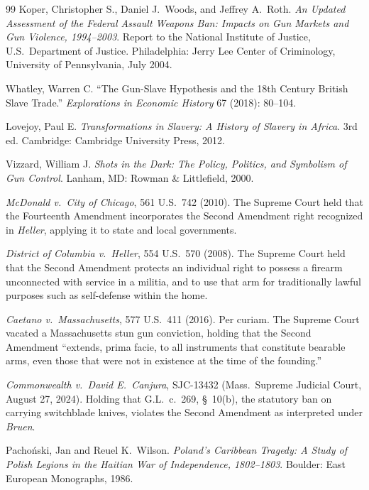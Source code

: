 \documentclass[12pt,openany]{book}
\begin{document}
\begin{thebibliography}{99}
Koper, Christopher S., Daniel J.~Woods, and Jeffrey A.~Roth. \textit{An Updated Assessment of the Federal Assault Weapons Ban: Impacts on Gun Markets and Gun Violence, 1994--2003}. Report to the National Institute of Justice, U.S.~Department of Justice. Philadelphia: Jerry Lee Center of Criminology, University of Pennsylvania, July 2004.

Whatley, Warren C. ``The Gun-Slave Hypothesis and the 18th Century British Slave Trade.'' \textit{Explorations in Economic History} 67 (2018): 80--104.

Lovejoy, Paul E. \textit{Transformations in Slavery: A History of Slavery in Africa}. 3rd ed. Cambridge: Cambridge University Press, 2012.

Vizzard, William J. \textit{Shots in the Dark: The Policy, Politics, and Symbolism of Gun Control}. Lanham, MD: Rowman \& Littlefield, 2000.

\textit{McDonald v.\ City of Chicago}, 561 U.S.~742 (2010). The Supreme Court held that the Fourteenth Amendment incorporates the Second Amendment right recognized in \textit{Heller}, applying it to state and local governments.

\textit{District of Columbia v.\ Heller}, 554 U.S.~570 (2008). The Supreme Court held that the Second Amendment protects an individual right to possess a firearm unconnected with service in a militia, and to use that arm for traditionally lawful purposes such as self-defense within the home.

\textit{Caetano v.\ Massachusetts}, 577 U.S.~411 (2016). Per curiam. The Supreme Court vacated a Massachusetts stun gun conviction, holding that the Second Amendment ``extends, prima facie, to all instruments that constitute bearable arms, even those that were not in existence at the time of the founding.''

\textit{Commonwealth v.\ David E.\ Canjura}, SJC-13432 (Mass.\ Supreme Judicial Court, August 27, 2024). Holding that G.L.\ c.~269, \S~10(b), the statutory ban on carrying switchblade knives, violates the Second Amendment as interpreted under \textit{Bruen}.

Pacho\'{n}ski, Jan and Reuel K.~Wilson. \textit{Poland's Caribbean Tragedy: A Study of Polish Legions in the Haitian War of Independence, 1802--1803}. Boulder: East European Monographs, 1986.


\end{thebibliography}
\end{document}
